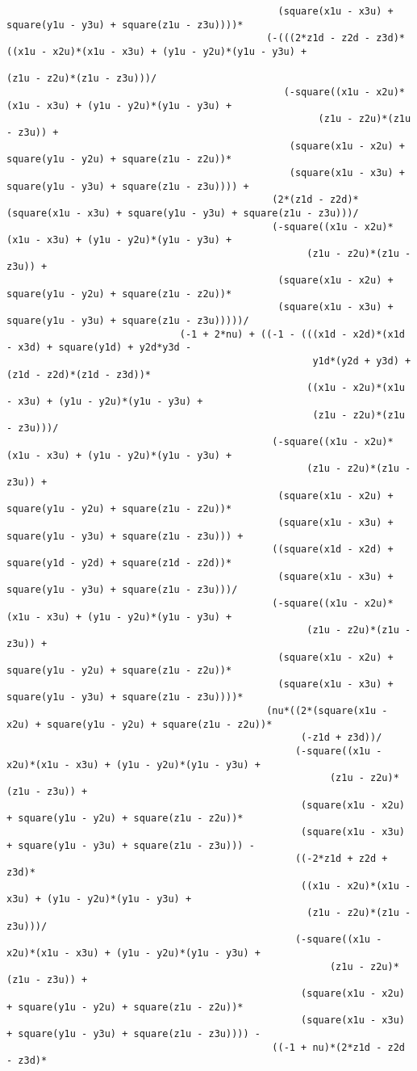 \begin{lstlisting}
											   (square(x1u - x3u) + square(y1u - y3u) + square(z1u - z3u))))*
											 (-(((2*z1d - z2d - z3d)*((x1u - x2u)*(x1u - x3u) + (y1u - y2u)*(y1u - y3u) + 
																	  (z1u - z2u)*(z1u - z3u)))/
												(-square((x1u - x2u)*(x1u - x3u) + (y1u - y2u)*(y1u - y3u) + 
													  (z1u - z2u)*(z1u - z3u)) + 
												 (square(x1u - x2u) + square(y1u - y2u) + square(z1u - z2u))*
												 (square(x1u - x3u) + square(y1u - y3u) + square(z1u - z3u)))) + 
											  (2*(z1d - z2d)*(square(x1u - x3u) + square(y1u - y3u) + square(z1u - z3u)))/
											  (-square((x1u - x2u)*(x1u - x3u) + (y1u - y2u)*(y1u - y3u) + 
													(z1u - z2u)*(z1u - z3u)) + 
											   (square(x1u - x2u) + square(y1u - y2u) + square(z1u - z2u))*
											   (square(x1u - x3u) + square(y1u - y3u) + square(z1u - z3u)))))/
							  (-1 + 2*nu) + ((-1 - (((x1d - x2d)*(x1d - x3d) + square(y1d) + y2d*y3d - 
													 y1d*(y2d + y3d) + (z1d - z2d)*(z1d - z3d))*
													((x1u - x2u)*(x1u - x3u) + (y1u - y2u)*(y1u - y3u) + 
													 (z1u - z2u)*(z1u - z3u)))/
											  (-square((x1u - x2u)*(x1u - x3u) + (y1u - y2u)*(y1u - y3u) + 
													(z1u - z2u)*(z1u - z3u)) + 
											   (square(x1u - x2u) + square(y1u - y2u) + square(z1u - z2u))*
											   (square(x1u - x3u) + square(y1u - y3u) + square(z1u - z3u))) + 
											  ((square(x1d - x2d) + square(y1d - y2d) + square(z1d - z2d))*
											   (square(x1u - x3u) + square(y1u - y3u) + square(z1u - z3u)))/
											  (-square((x1u - x2u)*(x1u - x3u) + (y1u - y2u)*(y1u - y3u) + 
													(z1u - z2u)*(z1u - z3u)) + 
											   (square(x1u - x2u) + square(y1u - y2u) + square(z1u - z2u))*
											   (square(x1u - x3u) + square(y1u - y3u) + square(z1u - z3u))))*
											 (nu*((2*(square(x1u - x2u) + square(y1u - y2u) + square(z1u - z2u))*
												   (-z1d + z3d))/
												  (-square((x1u - x2u)*(x1u - x3u) + (y1u - y2u)*(y1u - y3u) + 
														(z1u - z2u)*(z1u - z3u)) + 
												   (square(x1u - x2u) + square(y1u - y2u) + square(z1u - z2u))*
												   (square(x1u - x3u) + square(y1u - y3u) + square(z1u - z3u))) - 
												  ((-2*z1d + z2d + z3d)*
												   ((x1u - x2u)*(x1u - x3u) + (y1u - y2u)*(y1u - y3u) + 
													(z1u - z2u)*(z1u - z3u)))/
												  (-square((x1u - x2u)*(x1u - x3u) + (y1u - y2u)*(y1u - y3u) + 
														(z1u - z2u)*(z1u - z3u)) + 
												   (square(x1u - x2u) + square(y1u - y2u) + square(z1u - z2u))*
												   (square(x1u - x3u) + square(y1u - y3u) + square(z1u - z3u)))) - 
											  ((-1 + nu)*(2*z1d - z2d - z3d)*

\end{lstlisting}
